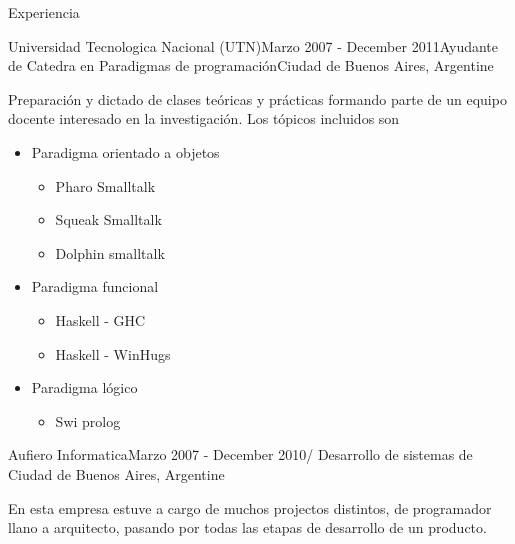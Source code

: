 \documentclass{resume} %
\begin{document}
\begin{rSection}{Experiencia}
\begin{rSubsection}{Universidad Tecnologica Nacional (UTN)}{Marzo 2007 - December 2011}{Ayudante de Catedra en Paradigmas de programaci\'on}{Ciudad de Buenos Aires, Argentine}
\item Preparaci\'on y dictado de clases te\'oricas y pr\'acticas formando parte de un equipo docente interesado en la investigaci\'on. Los t\'opicos incluidos son
\begin{itemize}
	\item Paradigma orientado a objetos
	\begin{itemize}
		\item Pharo Smalltalk
		\item Squeak Smalltalk
		\item Dolphin smalltalk
	\end{itemize}
	\item Paradigma funcional
	\begin{itemize}
		\item Haskell - GHC
		\item Haskell - WinHugs
	\end{itemize}
	\item Paradigma l\'ogico
	\begin{itemize}
		\item  Swi prolog
	\end{itemize}
\end{itemize}
\end{rSubsection}


\begin{rSubsection}{Aufiero Informatica}{Marzo 2007 - December 2010/ }{Desarrollo de sistemas de  }{Ciudad de Buenos Aires, Argentine}
\item En esta empresa estuve a cargo de muchos projectos distintos,  de programador llano a arquitecto, pasando por todas las etapas de desarrollo de un producto.


\end{rSubsection}
\end{rSection}
\end{document}
